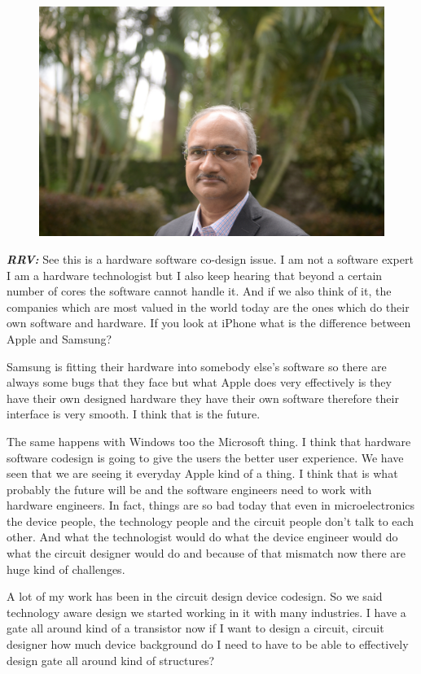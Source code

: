 \begin{multicols}{2}
\begin{figure}[H]
\centering
\includegraphics[scale=.5]{src/Figures/interview/interview-fig06.jpg}
\end{figure}

\textbf{\textit{RRV:}} See this is a hardware software co-design issue. I am not a software expert I am a hardware technologist but I also keep hearing that beyond a certain number of cores the software cannot handle it. And if we also think of it, the companies which are most valued in the world today are the ones which do their own software and hardware. If you look at iPhone what is the difference between Apple and Samsung?

Samsung is fitting their hardware into somebody else’s software so there are always some bugs that they face but what Apple does very effectively is they have their own designed hardware they have their own software therefore their interface is very smooth. I think that is the future. 

The same happens with Windows too the Microsoft thing. I think that hardware software codesign is going to give the users the better user experience. We have seen that we are seeing it everyday Apple kind of a thing. I think that is what probably the future will be and the software engineers need to work with hardware engineers. In fact, things are so bad today that even in microelectronics the device people, the technology people and the circuit people don’t talk to each other. And what the technologist would do what the device engineer would do what the circuit designer would do and because of that mismatch now there are huge kind of challenges.

A lot of my work has been in the circuit design device codesign. So we said technology aware design we started working in it with many industries. I have a gate all around kind of a transistor now if I want to design a circuit, circuit designer how much device background do I need to have to be able to effectively design gate all around kind of structures? 


\end{multicols}

